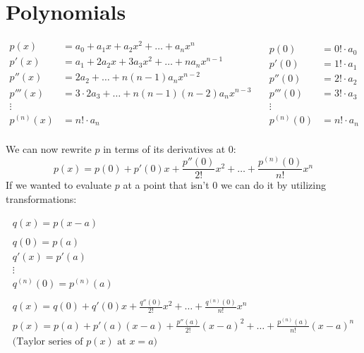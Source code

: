 \documentclass[00_complete]{subfiles}
\begin{document}
\section{Polynomials}

$$
\begin{aligned}
    p(x) &= a_0+a_1x+a_2x^2+ \dots + a_nx^n \\
    p'(x) &= a_1 + 2a_2x + 3a_3x^2+ \dots + na_nx^{n-1} \\
    p''(x) &= 2a_2 + \dots + n(n-1)a_nx^{n-2} \\
    p'''(x) &= 3\cdot2a_3 + \dots + n(n-1)(n-2)a_nx^{n-3} \\
    \vdots \\
    p^{(n)}(x) &= n! \cdot a_n \\
    \end{aligned} \quad
    \begin{aligned}
    p(0) &= 0! \cdot a_0 \\
    p'(0) &= 1! \cdot a_1 \\
    p''(0) &= 2! \cdot a_2 \\
    p'''(0) &= 3! \cdot a_3 \\
    \vdots \\
    p^{(n)}(0) &= n! \cdot a_n
\end{aligned}
$$

We can now rewrite $p$ in terms of its derivatives at $0$:
$$p(x) = p(0)+p'(0)x+\frac{p''(0)}{2!}x^2+\dots+\frac{p^{(n)}(0)}{n!}x^n$$
If we wanted to evaluate $p$ at a point that isn't $0$ we can do it by
utilizing transformations:

$$
\begin{gathered}
    q(x)=p(x-a) \\
    \\
    q(0)=p(a) \\
    q'(x)=p'(a) \\
    \vdots \\
    q^{(n)}(0)=p^{(n)}(a) \\
    \\
    q(x) = q(0)+q'(0)x+\frac{q''(0)}{2!}x^2+\dots+\frac{q^{(n)}(0)}{n!}x^n \\
    p(x)=p(a)+p'(a)(x-a)+\frac{p''(a)}{2!}(x-a)^2+\dots+\frac{p^{(n)}(a)}{n!}(x-a)^n \\
    \text{(Taylor series of $p(x)$ at $x=a$)}
\end{gathered}
$$
\end{document}
